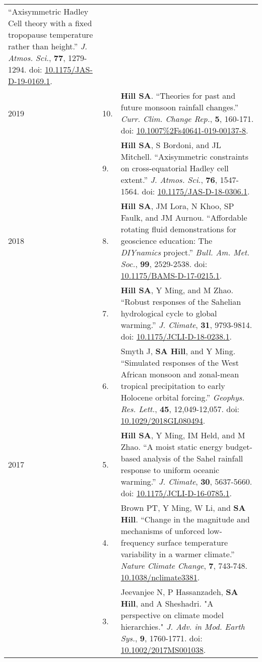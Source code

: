 \documentclass[letterpaper,11pt]{shillcv}
\begin{document}
\begin{longtable}{@{} Y{0.05\textwidth} >{\color{black}} p{0.04\textwidth} @{} L{0.91\textwidth} @{}}
``Axisymmetric Hadley Cell theory with a fixed tropopause temperature rather
than height.'' \emph{J. Atmos. Sci.}, \textbf{77}, 1279-1294.  doi: \href{https://doi.org/10.1175/JAS-D-19-0169.1}{10.1175/JAS-D-19-0169.1}.\\
2019 & 10. & \textbf{Hill SA}.  ``Theories for past and future monsoon rainfall
changes.'' \emph{Curr. Clim. Change Rep.}, \textbf{5}, 160-171.  doi: \href{https://doi.org/10.1007\%2Fs40641-019-00137-8}{10.1007\%2Fs40641-019-00137-8}.\\
     & 9. & \textbf{Hill SA}, S Bordoni, and JL Mitchell.
``Axisymmetric constraints on cross-equatorial Hadley cell extent.''
\emph{J. Atmos. Sci.}, \textbf{76}, 1547-1564.  doi: \href{https://doi.org/10.1175/JAS-D-18-0306.1}{10.1175/JAS-D-18-0306.1}.\\
2018 & 8. & \textbf{Hill SA}, JM Lora, N Khoo, SP Faulk, and
JM Aurnou.  ``Affordable rotating fluid demonstrations for
geoscience education: The \emph{DIYnamics} project.''  \emph{Bull.
Am. Met. Soc.}, \textbf{99}, 2529-2538.  doi: \href{https://doi.org/10.1175/BAMS-D-17-0215.1}{10.1175/BAMS-D-17-0215.1}.\\
     & 7. & \textbf{Hill SA}, Y Ming, and M Zhao.  ``Robust responses of the
Sahelian hydrological cycle to global warming.''  \emph{J. Climate}, \textbf{31}, 9793-9814.  doi: \href{https://doi.org/10.1175/JCLI-D-18-0238.1}{10.1175/JCLI-D-18-0238.1}.\\
     & 6. & Smyth J, \textbf{SA Hill}, and Y Ming.  ``Simulated responses of
the West African monsoon and zonal-mean tropical precipitation to early
Holocene orbital forcing.''  \emph{Geophys. Res. Lett.}, \textbf{45},
12,049-12,057.  doi: \href{https://doi.org/10.1029/2018GL080494}{10.1029/2018GL080494}.\\
2017 & 5. & \textbf{Hill SA}, Y Ming, IM Held, and M Zhao.  ``A moist
static energy budget-based analysis of the Sahel rainfall response to uniform
oceanic warming.''  \emph{J. Climate}, \textbf{30}, 5637-5660.  doi: \href{https://doi.org/10.1175/JCLI-D-16-0785.1}{10.1175/JCLI-D-16-0785.1}.\\
     & 4. & Brown PT, Y Ming, W Li, and \textbf{SA Hill}.  ``Change
in the magnitude and mechanisms of unforced low-frequency surface temperature
variability in a warmer climate.''  \emph{Nature Climate Change}, \textbf{7}, 743-748.  \href{https://doi.org/10.1038/nclimate3381}{10.1038/nclimate3381}.\\
     & 3. & Jeevanjee N, P Hassanzadeh, \textbf{SA Hill}, and A Sheshadri.  "A perspective on climate model hierarchies."  \emph{J.  Adv. in Mod. Earth Sys.}, \textbf{9}, 1760-1771.  doi: \href{https://doi.org/10.1002/2017MS001038}{10.1002/2017MS001038}.\\

\end{longtable}
\end{document}
